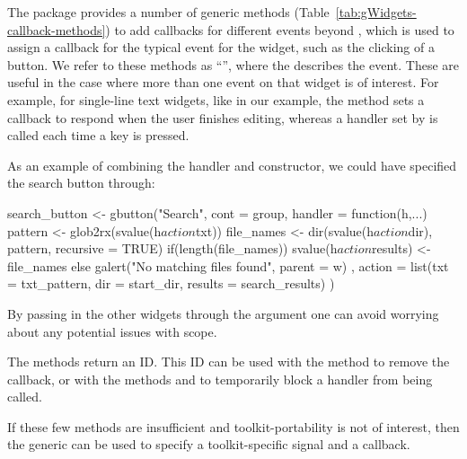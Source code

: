 The package provides a number of generic methods
(Table~\ref{tab:gWidgets-callback-methods}) to add callbacks for
different events beyond , which is used to
assign a callback for the typical event for the widget, such as the
clicking of a button. We refer to these methods as
``'', where the  describes the
event. These are useful in the case where more than one event on that
widget is of interest. For example, for single-line text widgets, like
 in our example, the  method
sets a callback to respond when the user finishes editing, whereas a
handler set by  is called each time a key is
pressed.

As an example of combining the handler and constructor, we could have
specified the search button through:
\begin{Schunk}
\begin{Sinput}
 search_button <- gbutton("Search", cont = group,
              handler = function(h,...) {
                pattern <- glob2rx(svalue(h$action$txt))
                file_names <- dir(svalue(h$action$dir), 
                              pattern, recursive = TRUE)
                if(length(file_names))
                  svalue(h$action$results) <- file_names
                else
                  galert("No matching files found", parent = w)
              },
              action = list(txt = txt_pattern, dir = start_dir,
                results = search_results)
              )
\end{Sinput}
\end{Schunk}
%
By passing in the other widgets through the  argument one
can avoid worrying about any potential issues with scope.

The  methods return an ID.  This ID can be used
with the method  to remove the callback, or with
the methods  and  to
temporarily block a handler from being called.

If these few methods are insufficient and toolkit-portability is not
of interest, then the  generic can be used to specify
a toolkit-specific signal and a callback.


